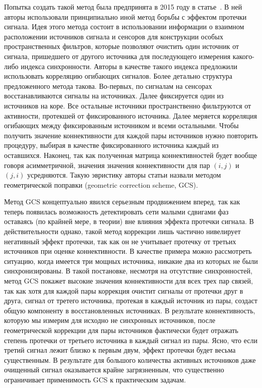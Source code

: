Попытка создать такой метод была предпринята в 2015 году в
статье~\cite{Wens2015}. В ней авторы использовали принципиально иной метод
борьбы с эффектом протечки сигнала.  Идея этого метода состоит в использовании
информации о взаимном расположении источников сигнала и сенсоров для
конструкции особых пространственных фильтров, которые позволяют очистить один
источник от сигнала, пришедшего от другого источника для последующего измерения
какого-либо индекса синхронности. Авторы в качестве такого индекса предложили
использовать корреляцию огибающих сигналов. Более детально структура
предложенного метода такова. Во-первых, по сигналам на сенсорах
восстанавливаются сигналы на источниках.  Далее фиксируется один из источников
на коре.  Все остальные источники пространственно фильтруются от активности,
протекшей от фиксированного источника.  Далее меряется корреляция огибающих
между фиксированным источником и всеми остальными.  Чтобы получить значение
коннективности для каждой пары источников нужно повторить процедуру, выбирая в
качестве фиксированного источника каждый из оставшихся.  Наконец, так как
полученная матрица коннективностей будет вообще говоря асимметричной, значения
значения коннективности для пар $(i,j)$ и $(j,i)$ усредняются. Такую эвристику
авторы статьи назвали методом геометрической поправки (geometric correction
scheme, GCS).

Метод GCS концептуально явился серьезным продвижением вперед, так как теперь
появилась возможность детектировать сети малыми сдвигами фаз оставаясь (по
крайней мере, в теории) вне влияния эффекта протечки сигнала.  В
действительности однако, такой метод коррекции лишь частично нивелирует
негативный эффект протечки, так как он не учитывает протечку от третьих
источников при оценке коннективности. В качестве примера можно рассмотреть ситуацию, когда имеется
три мощных источника, никакие два из которых не были синхронизированы.  В такой
постановке, несмотря на отсутствие синхронностей, метод GCS покажет высокие
значения коннективности для всех трех пар связей, так как хотя для каждой пары
коррекция очистит сигналы от протечки друг в друга, сигнал от третего
источника, протекая в каждый источник из пары, создаст общую компоненту в
восстановленных источниках.  В результате коннективность, которую мы измерим
для исходно не синхронных источников, после геометрической коррекции для пары
источников фактически будет отражать степень протечки от третьего источника в
каждый сигнал из пары. Ясно, что если третий сигнал лежит близко к первым двум,
эффект протечки будет весьма существенным. В результате для большого количества
активных источников даже очищенный сигнал оказывается крайне загрязненным, что
существенно ограничивает применимость GCS к практическим задачам.

